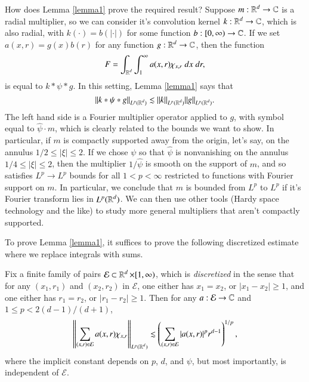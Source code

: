How does Lemma \ref{lemma1} prove the required result? Suppose $m: \operatorname{\mathbb{R}}^d \to \operatorname{\mathbb{C}}$ is a radial multiplier, so we can consider it's convolution kernel $k: \operatorname{\mathbb{R}}^d \to \operatorname{\mathbb{C}}$, which is also radial, with $k(\cdot) = b(|\cdot|)$ for some function $b: [0,\infty) \to \operatorname{\mathbb{C}}$. If we set $a(x,r) = g(x) b(r)$ for any function $g: \operatorname{\mathbb{R}}^d \to \operatorname{\mathbb{C}}$, then the function
%
\[ F = \int_{\operatorname{\mathbb{R}}^d} \int_1^\infty a(x,r) \chi_{x, r}\; dx\; dr, \]
%
is equal to $k * \psi * g$. In this setting, Lemma \ref{lemma1} says that
%
\[ \| k * \psi * g \|_{L^p(\operatorname{\mathbb{R}}^d)} \lesssim \| k \|_{L^p(\operatorname{\mathbb{R}}^d)} \| g \|_{L^p(\operatorname{\mathbb{R}}^d)}. \]
%
The left hand side is a Fourier multiplier operator applied to $g$, with symbol equal to $\widehat{\psi} \cdot m$, which is clearly related to the bounds we want to show. In particular, if $m$ is compactly supported away from the origin, let's say, on the annulus $1/2 \leq |\xi| \leq 2$. If we chose $\psi$ so that $\widehat{\psi}$ is nonvanishing on the annulus $1/4 \leq |\xi| \leq 2$, then the multiplier $1/\widehat{\psi}$ is smooth on the support of $m$, and so satisfies $L^p \to L^p$ bounds for all $1 < p < \infty$ restricted to functions with Fourier support on $m$. In particular, we conclude that $m$ is bounded from $L^p$ to $L^p$ if it's Fourier transform lies in $L^p(\operatorname{\mathbb{R}}^d)$. We can then use other tools (Hardy space technology and the like) to study more general multipliers that aren't compactly supported.

To prove Lemma \ref{lemma1}, it suffices to prove the following discretized estimate where we replace integrals with sums.

\begin{theorem} \label{lemma2}
    Fix a finite family of pairs $\mathcal{E} \subset \operatorname{\mathbb{R}}^d \times [1,\infty)$, which is \emph{discretized} in the sense that for any $(x_1,r_1)$ and $(x_2,r_2)$ in $\mathcal{E}$, one either has $x_1 = x_2$, or $|x_1 - x_2| \geq 1$, and one either has $r_1 = r_2$, or $|r_1 - r_2| \geq 1$. Then for any $a: \mathcal{E} \to \operatorname{\mathbb{C}}$ and $1 \leq p < 2(d - 1)/(d+1)$, 
    \[ \left\| \sum_{(x,r) \in \mathcal{E}} a(x,r) \chi_{x, r} \right\|_{L^p(\operatorname{\mathbb{R}}^d)} \lesssim \left( \sum_{(x,r) \in \mathcal{E}} |a(x,r)|^p r^{d-1} \right)^{1/p}, \]
    where the implicit constant depends on $p$, $d$, and $\psi$, but most importantly, is independent of $\mathcal{E}$.
\end{theorem}


